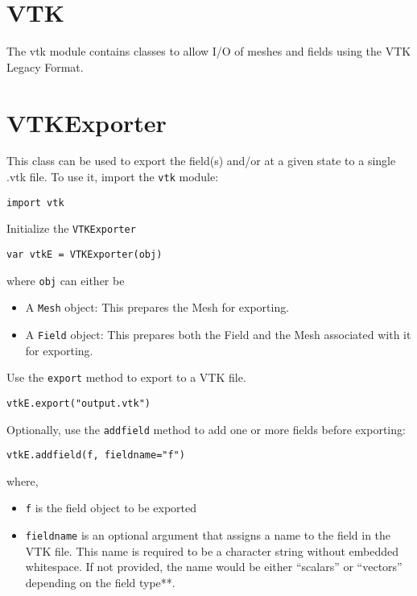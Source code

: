 \hypertarget{vtk}{%
\section{VTK}\label{vtk}}

The vtk module contains classes to allow I/O of meshes and fields using
the VTK Legacy Format.

\hypertarget{vtkexporter}{%
\section{VTKExporter}\label{vtkexporter}}

This class can be used to export the field(s) and/or at a given state to
a single .vtk file. To use it, import the \texttt{vtk} module:

\begin{lstlisting}
import vtk
\end{lstlisting}

Initialize the \texttt{VTKExporter}

\begin{lstlisting}
var vtkE = VTKExporter(obj)
\end{lstlisting}

where \texttt{obj} can either be

\begin{itemize}

\item
  A \texttt{Mesh} object: This prepares the Mesh for exporting.
\item
  A \texttt{Field} object: This prepares both the Field and the Mesh
  associated with it for exporting.
\end{itemize}

Use the \texttt{export} method to export to a VTK file.

\begin{lstlisting}
vtkE.export("output.vtk")
\end{lstlisting}

Optionally, use the \texttt{addfield} method to add one or more fields
before exporting:

\begin{lstlisting}
vtkE.addfield(f, fieldname="f")
\end{lstlisting}

where,

\begin{itemize}

\item
  \texttt{f} is the field object to be exported
\item
  \texttt{fieldname} is an optional argument that assigns a name to the
  field in the VTK file. This name is required to be a character string
  without embedded whitespace. If not provided, the name would be either
  ``scalars'' or ``vectors'' depending on the field type**.
\end{itemize}

